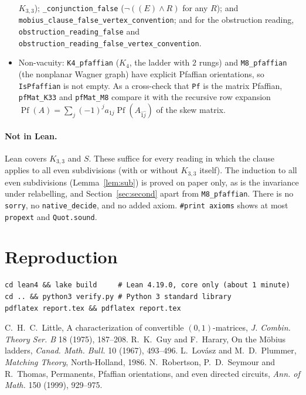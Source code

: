 \documentclass[11pt]{article}
\theoremstyle{definition}
\theoremstyle{remark}
\begin{document}
\begin{itemize}
$K_{3,3}$); \texttt{\_conjunction\_false} ($\neg((E)\wedge R)$ for any $R$); and
\texttt{mobius\_clause\_false\_vertex\_convention}; and for the obstruction reading,
\texttt{obstruction\_reading\_false} and
\texttt{obstruction\_reading\_false\_vertex\_convention}.
\item Non-vacuity: \texttt{K4\_pfaffian} ($K_4$, the ladder with $2$ rungs) and
\texttt{M8\_pfaffian} (the nonplanar Wagner graph) have explicit Pfaffian
orientations, so \texttt{IsPfaffian} is not empty. As a cross-check that
\texttt{Pf} is the matrix Pfaffian, \texttt{pfMat\_K33} and \texttt{pfMat\_M8} compare
it with the recursive row expansion
$\operatorname{Pf}(A)=\sum_j(-1)^{j}a_{1j}\operatorname{Pf}(A_{\hat1\hat j})$ of the skew
matrix.
\end{itemize}
\paragraph{Not in Lean.} Lean covers $K_{3,3}$ and $S$. These suffice for every
reading in which the clause applies to all even subdivisions (with or without
$K_{3,3}$ itself). The induction to all even subdivisions
(Lemma~\ref{lem:sub}) is proved on paper only, as is the invariance under
relabelling, and Section~\ref{sec:second} apart from \texttt{M8\_pfaffian}.
There is no
\texttt{sorry}, no \texttt{native\_decide}, and no added axiom.
\texttt{\#print axioms} shows at most \texttt{propext} and \texttt{Quot.sound}.

\section{Reproduction}
\begin{verbatim}
cd lean4 && lake build     # Lean 4.19.0, core only (about 1 minute)
cd .. && python3 verify.py # Python 3 standard library
pdflatex report.tex && pdflatex report.tex
\end{verbatim}

\begin{thebibliography}{9}
 C.~H.~C.~Little, A characterization of convertible $(0,1)$-matrices,
\emph{J. Combin. Theory Ser. B} 18 (1975), 187--208.
 R.~K.~Guy and F.~Harary, On the M\"obius ladders, \emph{Canad. Math. Bull.}
10 (1967), 493--496.
 L.~Lov\'asz and M.~D.~Plummer, \emph{Matching Theory}, North-Holland, 1986.
 N.~Robertson, P.~D.~Seymour and R.~Thomas, Permanents, Pfaffian
orientations, and even directed circuits, \emph{Ann. of Math.} 150 (1999), 929--975.
\end{thebibliography}
\end{document}
